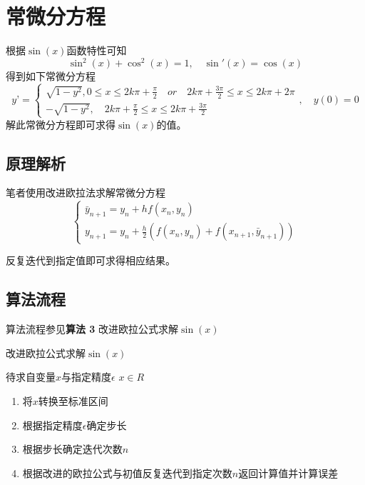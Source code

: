 \documentclass[lang=cn,11pt,a4paper]{elegantpaper}
\begin{document}
\section{常微分方程}
根据$\sin(x)$函数特性可知
\begin{equation}
  {\sin}^2(x)+{\cos}^2(x)=1, \quad {\sin}'(x)={\cos}(x)
\end{equation}
得到如下常微分方程
\begin{equation}
y’=\left\{\begin{array}{l}{\sqrt{1-y^2},0 \leq x \leq 2k\pi+\frac{\pi}{2} \quad or \quad 2k\pi + \frac{3\pi}{2}} \leq x \leq 2k\pi + 2\pi \\ {-\sqrt{1-y^2},\quad 2k\pi + \frac{\pi}{2} \leq x \leq 2k\pi+\frac{3\pi}{2}}\end{array}\right.,\quad y(0)=0
\end{equation}
解此常微分方程即可求得$\sin(x)$的值。
\subsection{原理解析}
笔者使用改进欧拉法求解常微分方程
\begin{equation}
\left\{\begin{array}{l}{\bar{y}_{n+1}=y_{n}+h f\left(x_{n}, y_{n}\right)} \\ {y_{n+1}=y_{n}+\frac{h}{2}\left(f\left(x_{n}, y_{n}\right)+f\left(x_{n+1}, \bar{y}_{n+1}\right)\right)}\end{array}\right.
\end{equation}

反复迭代到指定值即可求得相应结果。
\subsection{算法流程}
算法流程参见\textbf{算法 3} 改进欧拉公式求解$\sin(x)$
\begin{algorithm}
  \caption{改进欧拉公式求解$\sin(x)$}
  \begin{algorithmic}
    \Require 待求自变量$x$与指定精度$\epsilon$
    \Ensure $x\in R$
    \begin{enumerate}
      \item 将$x$转换至标准区间
      \item 根据指定精度$\epsilon$确定步长
      \item 根据步长确定迭代次数$n$
      \item 根据改进的欧拉公式与初值反复迭代到指定次数$n$返回计算值并计算误差
    \end{enumerate}
  \end{algorithmic}
\end{algorithm}
\end{document}
